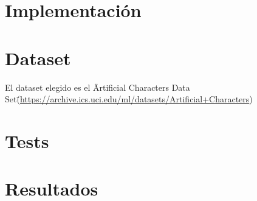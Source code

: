 \documentclass[letterpaper,11pt]{article} %
\begin{document}








\section{Implementación}
\section{Dataset}
El dataset elegido es el \"Artificial Characters Data Set\" (\url{https://archive.ics.uci.edu/ml/datasets/Artificial+Characters})
\section{Tests}
\section{Resultados}


\end{document}
